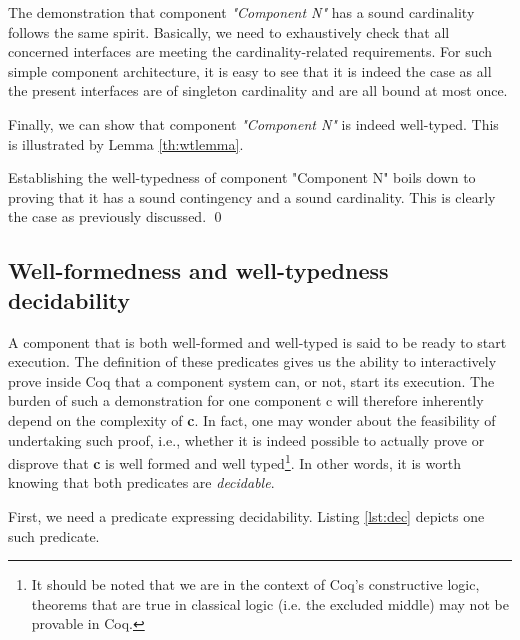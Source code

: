 	\noindent The demonstration that \textsf{component} \textit{"Component N"}
	has a sound cardinality follows the same spirit. Basically, 	we need to exhaustively
	check that all concerned \textsf{interface}s are meeting the cardinality-related 
	requirements. For such simple \textsf{component} architecture, it is easy to see
	that it is indeed the case as all the present \textsf{interface}s are of \textsf{singleton}
	\textsf{cardinality} and are all bound at most once. 
	
		Finally, we can show that \textsf{component} \textit{"Component N"} is 
	indeed well-typed. This is illustrated by Lemma \ref{th:wtlemma}.
		

\begin{lemma} \label{th:wtlemma} 
			
		Establishing the well-typedness of component "Component N" boils down to
	proving that it has a sound contingency and a sound cardinality. This is clearly the case
	as previously discussed. \qed
\end{lemma}


\subsection{Well-formedness and well-typedness decidability}
\label{sub:wfdec}


	A \textsf{component} that is both well-formed and well-typed is said to be ready to 
	start execution. The definition of these predicates gives us the ability to interactively prove inside Coq	
	that a \textsf{component} system can, or not, start its execution. The burden of such a demonstration for one  
	component \textsf{c} will therefore inherently depend on the complexity of \textbf{c}. In fact, one may wonder
	about the feasibility of undertaking such proof, i.e., whether it is indeed possible to actually prove
	or disprove that \textbf{c} is well formed and well typed\footnote{It should be noted that
	we are in the context of Coq's constructive logic, theorems that are true in 
	classical logic (i.e. the excluded middle) may not be provable in Coq.}.	 In other words, it is
	worth knowing that both predicates are \textit{decidable}.
	
		First, we need a predicate expressing decidability. Listing \ref{lst:dec} depicts one such
	predicate.		
	
	   
	
